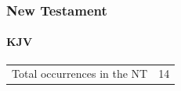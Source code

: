 			
		
		
	\subsubsection{New Testament} %
		\label{RECONCILIATION-NT}
	
		\paragraph{KJV}
			\label{RECONCILIATION-NT-KJV}
			
	
			\begin{tabular}{ll}
				Total occurrences in the NT & 14
			\end{tabular}
			

